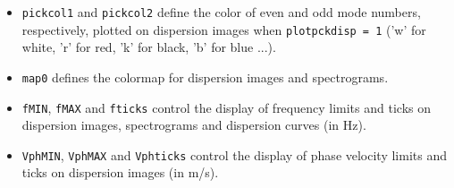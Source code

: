 \documentclass[twoside,a4paper]{article}
\begin{document}
\begin{itemize}[leftmargin=*]
\item \verb|pickcol1| and \verb|pickcol2| define the color of even and odd mode numbers, respectively, plotted on dispersion images when \verb|plotpckdisp = 1| ('w' for white, 'r' for red, 'k' for black, 'b' for blue ...).\\[2ex]

\item \verb|map0| defines the colormap for dispersion images and spectrograms.

\item \verb|fMIN|, \verb|fMAX| and \verb|fticks| control the display of frequency limits and ticks on dispersion images, spectrograms and dispersion curves (in Hz).

\item \verb|VphMIN|, \verb|VphMAX| and \verb|Vphticks| control the display of phase velocity limits and ticks on dispersion images (in m/s).
\end{itemize}
\end{document}
